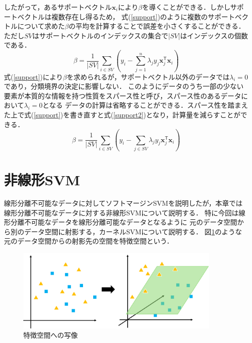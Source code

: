 \documentclass[11pt,a4paper,titlepage]{ltjsarticle}
\begin{document}
したがって，あるサポートベクトル$\bm{x}_i$により$\beta$を導くことができる．しかしサポートベクトルは複数存在し得るため，
式(\ref{support})のように複数のサポートベクトルについて求めた$\beta$の平均を計算することで誤差を小さくすることができる．
ただし$SV$はサポートベクトルのインデックスの集合で$|SV|$はインデックスの個数である．
\begin{equation}
    \label{support}
    \beta = \frac{1}{|SV|}\sum_{i\in SV}\left(y_i - \sum_{j=1}^{n}\lambda_jy_j\bm{x}_j^\mathsf{T}\bm{x}_i\right)
\end{equation}
式(\ref{support})により$\beta$を求められるが，サポートベクトル以外のデータでは$\lambda_i = 0$であり，分類境界の決定に影響しない．
このようにデータのうち一部の少ない要素が本質的な情報を持つ性質をスパース性と呼び\cite{sparce}，スパース性のあるデータにおいて$\lambda_i = 0$となる
データの計算は省略することができる．スパース性を踏まえた上で式(\ref{support})を書き直すと式(\ref{support2})となり，計算量を減らすことができる．
\begin{equation}
    \label{support2}
    \beta = \frac{1}{|SV|}\sum_{i \in SV}\left(y_i - \sum_{j \in SV}\lambda_jy_j\bm{x}_j^\mathsf{T}\bm{x}_i\right)
\end{equation}

\section{非線形SVM}
線形分離不可能なデータに対してソフトマージンSVMを説明したが，本章では線形分離不可能なデータに対する非線形SVMについて説明する．
特に今回は線形分離不可能なデータを線形分離可能なデータとなるように
元のデータ空間から別のデータ空間に射影する，カーネルSVMについて説明する．
図\ref{fig:nonlin-karnel}のような元のデータ空間からの射影先の空間を特徴空間という．
\begin{figure}[H]
    \centering
    \centering
    \includegraphics[width=0.9\textwidth]{image/karnel.png}
    \caption{特徴空間への写像}
    \label{fig:nonlin-karnel}
\end{figure}
\end{document}
